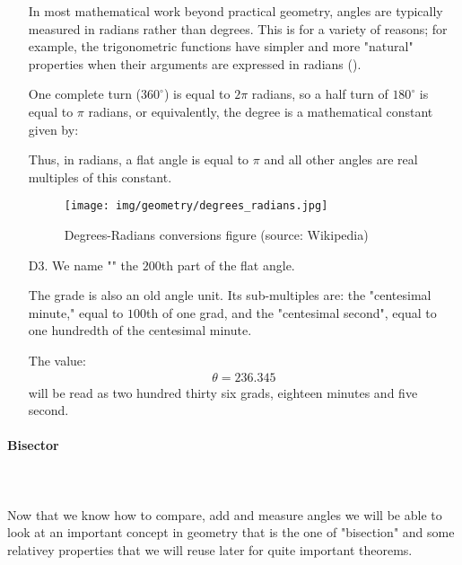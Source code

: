 \begin{enumerate}
		In most mathematical work beyond practical geometry, angles are typically measured in radians rather than degrees. This is for a variety of reasons; for example, the trigonometric functions have simpler and more "natural" properties when their arguments are expressed in radians (). 
		
		One complete turn ($360^\circ $) is equal to $2\pi$ radians, so a half turn of $180^\circ$ is equal to $\pi$ radians, or equivalently, the degree is a mathematical constant given by:
		
		Thus, in radians, a flat angle is equal to $\pi$ and all other angles are real multiples of this constant.
		\begin{figure}[H]
			\centering
			\texttt{[image: img/geometry/degrees\_radians.jpg]}
			\caption[Degrees-Radians conversions figure]{Degrees-Radians conversions figure (source: Wikipedia)}
		\end{figure}

		\item[D3.] We name "" the $200$th part of the flat angle.
		
		The grade is also an old angle unit. Its sub-multiples are: the "centesimal minute," equal to $100$th of one grad, and the "centesimal second", equal to one hundredth of the centesimal minute.
		
		The value:
		\begin{gather*}
			\theta=236.345
		\end{gather*}
		 will be read as two hundred thirty six grads, eighteen  minutes and five second.
	\end{enumerate}
	
	\pagebreak
	\paragraph{Bisector}\mbox{}\\\\
	Now that we know how to compare, add and measure angles we will be able to look at an important concept in geometry that is the one of "bisection" and some relativey properties that we will reuse later for quite important theorems.

